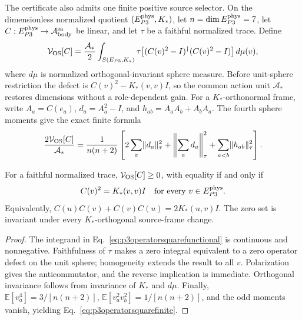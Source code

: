 The certificate also admits one finite positive source selector.  On the
dimensionless normalized quotient $(E_{P3}^{\rm phys},K_*)$, let
$n=\dim E_{P3}^{\rm phys}=7$, let $C:E_{P3}^{\rm phys}\to
\mathcal A_{\rm body}^{\rm sa}$ be linear, and let $\tau$ be a faithful
normalized trace.  Define
\begin{equation}
 \mathcal V_{\rm OS}[C]
 = \frac{\mathcal A_*}{2}
 \int_{S(E_{P3},K_*)}
 \tau\!\left[
 (C(v)^2-I)^\dagger(C(v)^2-I)
 \right]d\mu(v),
 \label{eq:p3operatorsquarefunctional}
\end{equation}
where $d\mu$ is normalized orthogonal-invariant sphere measure.  Before
unit-sphere restriction the defect is $C(v)^2-K_*(v,v)I$, so the common
action unit $\mathcal A_*$ restores dimensions without a role-dependent gain.
For a $K_*$-orthonormal frame, write $A_a=C(e_a)$,
$d_a=A_a^2-I$, and $h_{ab}=A_aA_b+A_bA_a$.  The fourth sphere moments give
the exact finite formula
\begin{equation}
 \frac{2\mathcal V_{\rm OS}[C]}{\mathcal A_*}
 =\frac{1}{n(n+2)}\left[
 2\sum_a\lVert d_a\rVert_\tau^2
 +\left\lVert\sum_a d_a\right\rVert_\tau^2
 +\sum_{a<b}\lVert h_{ab}\rVert_\tau^2
 \right].
 \label{eq:p3operatorsquarefinite}
\end{equation}

\begin{theorem}
\label{thm:p3operatorsquareselector}
For a faithful normalized trace,
$\mathcal V_{\rm OS}[C]\geq0$, with equality if and only if
\begin{equation}
 C(v)^2=K_*(v,v)I
 \quad\hbox{for every }v\in E_{P3}^{\rm phys}.
 \label{eq:p3operatorsquarezero}
\end{equation}
Equivalently,
$C(u)C(v)+C(v)C(u)=2K_*(u,v)I$.  The zero set is invariant under every
$K_*$-orthogonal source-frame change.
\end{theorem}

\begin{proof}
The integrand in Eq.~\eqref{eq:p3operatorsquarefunctional} is continuous and
nonnegative.  Faithfulness of $\tau$ makes a zero integral equivalent to a
zero operator defect on the unit sphere; homogeneity extends the result to
all $v$.  Polarization gives the anticommutator, and the reverse implication
is immediate.  Orthogonal invariance follows from invariance of $K_*$ and
$d\mu$.  Finally,
$\mathbb E[v_a^4]=3/[n(n+2)]$,
$\mathbb E[v_a^2v_b^2]=1/[n(n+2)]$, and the odd moments vanish, yielding
Eq.~\eqref{eq:p3operatorsquarefinite}.
\end{proof}

